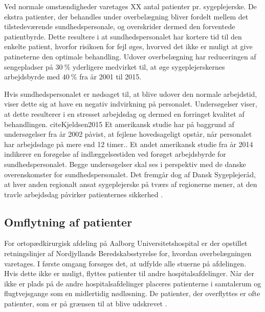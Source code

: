 \noindent 
Ved normale omstændigheder varetages XX antal patienter pr. sygeplejerske. De ekstra patienter, der behandles under overbelægning bliver fordelt mellem det tilstedeværende sundhedspersonale, og overskrider dermed den forventede patientbyrde. 
Dette resultere i at sundhedspersonalet har kortere tid til den enkelte patient, hvorfor risikoen for fejl øges, hvorved det ikke er muligt at give patineterne den optimale behandling. \cite{Dinges2004} \cite{Aiken2002} Udover overbelægning har reduceringen af sengepladser på $30~\%$ yderligere medvirket til, at øge sygeplejerskernes arbejdsbyrde med $40~\%$ fra år 2001 til 2015. \cite{Kjeldsen2015}


Hvis sundhedspersonalet er nødsaget til, at blive udover den normale arbejdstid, viser dette sig at have en negativ indvirkning på personalet.\cite{Kjeldsen2015} \cite{Dinges2004} Undersøgelser viser, at dette resulterer i en stresset arbejdsdag og dermed en forringet kvalitet af behandlingen. cite{Kjeldsen2015} Et amerikansk studie har på baggrund af undersøgelser fra år 2002 påvist, at fejlene hovedsageligt opstår, når personalet har arbejdsdage på mere end 12 timer.\cite{Dinges2004}. Et andet amerikansk studie fra år 2014 indikerer en forøgelse af indlæggelsestiden ved forøget arbejdsbyrde for sundhedspersonalet\cite{Elliott2014}. Begge undersøgelser skal ses i perspektiv med de danske overenskomster for sundhedspersonalet. Det fremgår dog af Dansk Sygeplejeråd, at hver anden regionalt ansat sygeplejerske på tværs af regionerne mener, at den travle arbejdsdag påvirker patienternes sikkerhed \cite{Kjeldsen2015}. 


\subsection{Omflytning af patienter}
For ortopædkirurgisk afdeling på Aalborg Universitetshospital er der opstillet retningslinjer af Nordjyllands Beredskabsstyrelse for, hvordan overbelægningen varetages. I første omgang forsøges det, at udfylde alle stuerne på afdelingen. Hvis dette ikke er muligt, flyttes patienter til andre hospitalsafdelinger. Når der ikke er plads på de andre hospitalsafdelinger placeres patienterne i samtalerum og flugtvejsgange som en midlertidig nødløsning. \cite{Beredskab2016} De patienter, der overflyttes er ofte patienter, som er på grænsen til at blive udskrevet .


